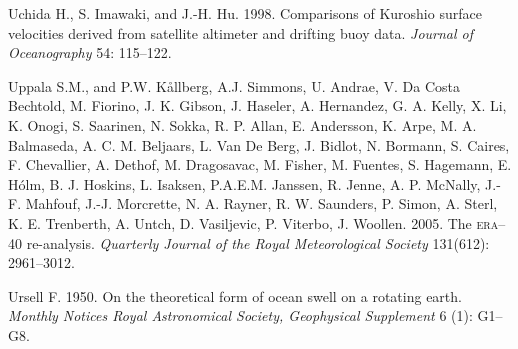 \begin{thebibliography}{999}
Uchida H., S. Imawaki, and J.-H. Hu.  1998. Comparisons of Kuroshio
surface velocities derived from satellite altimeter and drifting buoy
data. \textit{Journal of Oceanography} 54: 115--122.
%

Uppala S.M., and P.W. K\r{a}llberg, A.J. Simmons, U. Andrae, V. Da
Costa Bechtold, M. Fiorino, J. K. Gibson, J. Haseler, A. Hernandez,
G. A. Kelly, X. Li, K. Onogi, S. Saarinen, N. Sokka, R. P. Allan,
E. Andersson, K. Arpe, M. A. Balmaseda, A. C. M. Beljaars, L. Van De
Berg, J. Bidlot, N. Bormann, S. Caires, F. Chevallier, A. Dethof,
M. Dragosavac, M. Fisher, M. Fuentes, S. Hagemann, E. H\'{o}lm,
B. J. Hoskins, L. Isaksen, P.A.E.M. Janssen, R. Jenne, A. P. McNally,
J.-F. Mahfouf, J.-J. Morcrette, N. A. Rayner, R. W. Saunders,
P. Simon, A. Sterl, K. E. Trenberth, A. Untch, D. Vasiljevic,
P. Viterbo, J. Woollen. 2005. The \textsc{era}--40
re-analysis. \textit{Quarterly Journal of the Royal Meteorological
  Society} 131(612): 2961--3012.
%

Ursell F.  1950. On the theoretical form of ocean swell on a rotating
earth. \textit{Monthly Notices Royal Astronomical Society, Geophysical
  Supplement} 6 (1): G1--G8.
%


\end{thebibliography}
